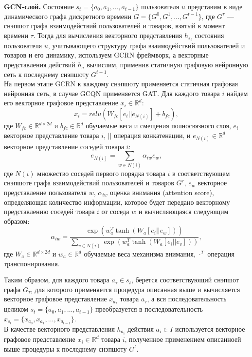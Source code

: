 \documentclass[a4paper,14pt,oneside]{mipt-thesis-ms}
\begin{document}
{\bf GCN-слой.} Состояние $s_t = \{a_0, a_1, \dots, a_{t-1}\}$ пользователя $u$ представим в виде динамического графа дискретного времени $G = \{G^0, G^1, \dots, G^{t-1}\}$, где $G^{\tau}$ --- снэпшот графа взаимодействий пользователей и товаров, взятый в момент времени $\tau$. Тогда для вычисления векторного представления $h_{s_t}$ состояния пользователя $u$, учитывающего структуру графа взаимодействий пользователей и товаров и его динамику, используем GCRN фреймворк, а векторные представления действий $h_a$ вычислим, применив статичную графовую нейронную сеть к последнему снэпшоту $G^{t-1}$.\\

На первом этапе GCRN к каждому снэпшоту применяется статичная графовая нейронная сеть, в случае GCQN применяется GAT. Для каждого товара $i$ найдем его векторное графовое представление $x_i \in \mathbb{R}^d$:
$$x_i = {relu}(W_{fc}[e_i || e_{N(i)}] + b_{fc}),$$
где $W_{fc} \in \mathbb{R}^{d \times 2d}$ и $b_{fc} \in \mathbb{R}^d$ обучаемые веса и смещения полносвязного слоя, $e_i$ векторное представление товара $i$, $||$ операция конкатенации, и $e_{N(i)} \in \mathbb{R}^d$ векторное представление соседей товара $i$:
$$e_{N(i)} = \sum_{w \in N(i)} \alpha_{iw}e_w,$$
где $N(i)$ множество соседей первого порядка товара $i$ в соответствующем снэпшоте графа взаимодействий пользователей и товаров $G^{\tau}$, $e_w$ векторное представление пользователя $w$, $\alpha_{iw}$ оценка внимания (attention score), определяющая количество информации, которое будет передано векторному представлению соседей товара $i$ от соседа $w$ и вычисляющаяся следующим образом: 
$$\alpha_{iw} = \frac{\exp(w_a^T\tanh(W_a[e_i || e_w]))}{\sum_{v \in N(i)} \exp(w_a^T \tanh(W_a[e_i || e_v]))},$$
где $W_a \in \mathbb{R}^{d \times 2d}$ и $w_a \in \mathbb{R}^d$ обучаемые веса механизма внимания, $\cdot^T$ операция транспонирования.

Таким образом, для каждого товара $a_{\tau} \in s_t$, берется соответствующий снэпшот графа $G_{\tau}$, для которого применяется процедура описанная выше и вычисляется векторное графовое представление $x_{a_{\tau}}$ товара $a_{\tau}$, а вся последовательность целиком $s_t = \{a_0, a_1, \dots, a_{t-1}\}$ преобразуется в последовательность $x_{s_t} = \{x_{a_0}, x_{a_1}, \dots, x_{a_{t-1}}\}$.\\

В качестве векторного представления $h_{a_i}$ действия $a_i \in I$ используется векторное графовое представление $x_i \in \mathbb{R}^d$ товара $i$, полученное применением описанноей выше процедуры к последнему снэпшоту $G^t$.\\
\end{document}
